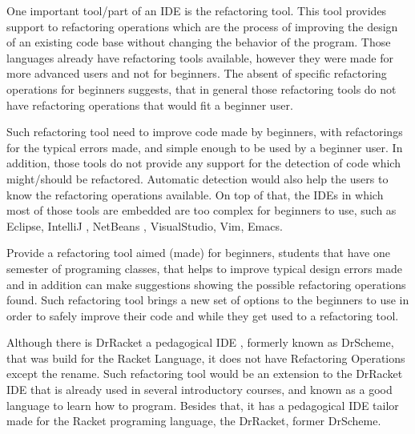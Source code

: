 One important tool/part of an IDE is the refactoring tool. This tool provides
support to refactoring operations which are the process of improving the design
of an existing code base \cite{fowler1999refactoring}
without changing the behavior of the program.
Those languages already have refactoring tools available, %
however they were made for more advanced users and not for beginners.
The absent of specific refactoring operations for beginners suggests, that in general %
those refactoring tools do not have refactoring operations that
would fit a beginner user.

Such refactoring tool need to improve code made by beginners, with refactorings for %
the typical errors made, and simple enough to be used by a beginner user.
In addition, those tools do not provide any support for the detection of code which might/should
be refactored.
Automatic detection would also help the users to know the refactoring operations available.
On top of that, the IDEs in which most of those tools are embedded are too complex for beginners
to use, such as Eclipse\cite{carlson2005eclipse}, IntelliJ \cite{bock2011intellij}, NetBeans \cite{boudreau2002netbeans},
 VisualStudio, Vim, Emacs. %

Provide a refactoring tool aimed (made) for beginners, students that have one semester %
of programing classes, that helps to improve typical design errors made and in addition can
make suggestions showing the possible refactoring operations found.
Such refactoring tool brings a new set of options to the beginners to use
in order to safely improve their code and while they get used to a refactoring tool.




Although there is DrRacket a pedagogical IDE \cite{drscheme} \cite{drscheme_pegadogy},
formerly known as DrScheme, that was
build for the Racket Language, it does not have Refactoring Operations except the rename.
Such refactoring tool would be an extension to the DrRacket IDE that is already
used in several introductory courses,
and known as a good language to learn how to program.
Besides that, it has a pedagogical IDE tailor made for the Racket programing language,
the DrRacket, former DrScheme. %

